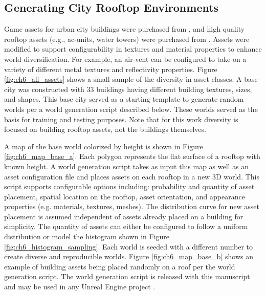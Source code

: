\subsection{Generating City Rooftop Environments}

Game assets for urban city buildings were purchased from \cite{urbancity}, and high quality rooftop assets (e.g., ac-units, water towers) were purchased from \cite{urbanrooftop}. Assets were modified to support configurability in textures and material properties to enhance world diversification. For example, an air-vent can be configured to take on a variety of different metal textures and reflectivity properties. Figure \ref{fig:ch6_all_assets} shows a small sample of the diversity in asset classes. A base city was constructed with 33 buildings having different building textures, sizes, and shapes. This base city served as a starting template to generate random worlds per a world generation script described below. These worlds served as the basis for training and testing purposes. Note that for this work diversity is focused on building rooftop assets, not the buildings themselves. 

A map of the base world colorized by height is shown in Figure \ref{fig:ch6_map_base_a}. Each polygon represents the flat surface of a rooftop with known height. A world generation script takes as input this map as well as an asset configuration file and places assets on each rooftop in a new 3D world. This script supports configurable options including: probability and quantity of asset placement, spatial location on the rooftop, asset orientation, and appearance properties (e.g. materials, textures, meshes).  The distribution curve for new asset placement is assumed independent of assets already placed on a building for simplicity. The quantity of assets can either be configured to follow a uniform distribution or model the histogram shown in Figure \ref{fig:ch6_histogram_sampling}. Each world is seeded with a different number to create diverse and reproducible worlds. Figure \ref{fig:ch6_map_base_b} shows an example of building assets being placed randomly on a roof per the world generation script. The  world generation script is released with this manuscript and may be used in any Unreal Engine project \cite{Castagno_Github_UnrealLanding}.


